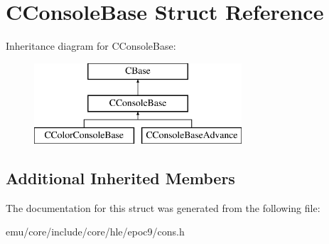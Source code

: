 \hypertarget{struct_c_console_base}{}\section{C\+Console\+Base Struct Reference}
\label{struct_c_console_base}
Inheritance diagram for C\+Console\+Base\+:\begin{figure}[H]
\begin{center}
\leavevmode
\includegraphics[height=3.000000cm]{struct_c_console_base}
\end{center}
\end{figure}
\subsection*{Additional Inherited Members}


The documentation for this struct was generated from the following file\+:\begin{DoxyCompactItemize}
\item 
emu/core/include/core/hle/epoc9/cons.\+h\end{DoxyCompactItemize}
